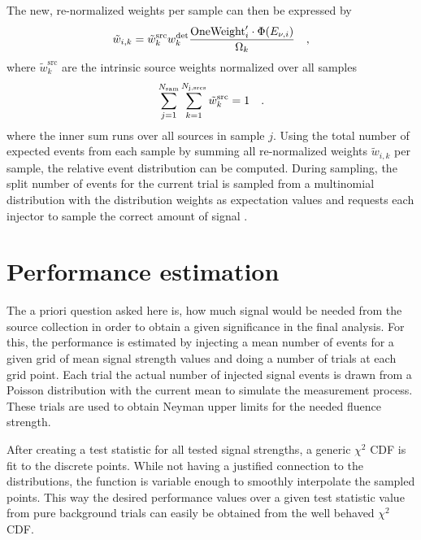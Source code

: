 The new, re-normalized weights per sample can then be expressed by
\begin{equation}
    \tilde{w}_{i,k}
    = \tilde{w}_k^\text{src} w_k^\text{det}
      \frac{\text{OneWeight}'_i \cdot \Phi(E_{\nu,i})}{\Omega_k}
  \quad\text{,}
\end{equation}
where $\tilde{w}_k^\text{src}$ are the intrinsic source weights normalized over all samples
\begin{equation}
  \sum_{j=1}^{N_\text{sam}} \sum_{k=1}^{N_\text{j,srcs}}
  \tilde{w}_k^\text{src} = 1
  \quad\text{.}
\end{equation}
where the inner sum runs over all sources in sample $j$.
Using the total number of expected events from each sample by summing all re-normalized weights $\tilde{w}_{i,k}$ per sample, the relative event distribution can be computed.
During sampling, the split number of events for the current trial is sampled from a multinomial distribution with the distribution weights as expectation values and requests each injector to sample the correct amount of signal .


\section{Performance estimation}
The a priori question asked here is, how much signal would be needed from the source collection in order to obtain a given significance in the final analysis.
For this, the performance is estimated by injecting a mean number of events for a given grid of mean signal strength values and doing a number of trials at each grid point.
Each trial the actual number of injected signal events is drawn from a Poisson distribution with the current mean to simulate the measurement process.
These trials are used to obtain Neyman upper limits  for the needed fluence strength.

After creating a test statistic for all tested signal strengths, a generic $\chi^2$ CDF is fit to the discrete points.
While not having a justified connection to the distributions, the function is variable enough to smoothly interpolate the sampled points.
This way the desired performance values over a given test statistic value from pure background trials can easily be obtained from the well behaved $\chi^2$ CDF.

